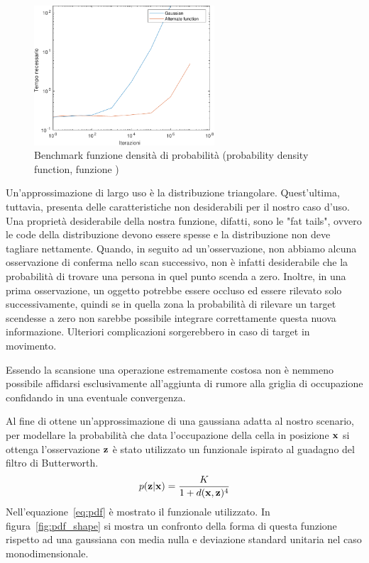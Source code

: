 \documentclass[a4paper]{article}
\begin{document}
	\begin{figure}[H]
		\centering
		\includegraphics[width=0.6\textwidth]{./img/pdf_benchmark.pdf}
		\caption{Benchmark funzione densità di probabilità (probability density function, funzione )}
		\label{fig:pdf_benchmark}
	\end{figure}

	Un'approssimazione di largo uso è la distribuzione triangolare.
	Quest'ultima, tuttavia, presenta delle caratteristiche non desiderabili per
	il nostro caso d'uso. Una proprietà desiderabile della nostra funzione,
	difatti, sono le "fat tails", ovvero le code della distribuzione devono
	essere spesse e la distribuzione non deve tagliare nettamente. Quando, in
	seguito ad un'osservazione, non abbiamo alcuna osservazione di conferma
	nello scan successivo, non è infatti desiderabile che la probabilità di
	trovare una persona in quel punto scenda a zero. Inoltre, in una prima
	osservazione, un oggetto potrebbe essere occluso ed essere rilevato solo
	successivamente, quindi se in quella zona la probabilità di rilevare un
	target scendesse a zero non sarebbe possibile integrare correttamente
	questa nuova informazione. Ulteriori complicazioni sorgerebbero in caso di
	target in movimento.
	
	Essendo la scansione una operazione estremamente costosa non è nemmeno
	possibile affidarsi esclusivamente all'aggiunta di rumore alla griglia di
	occupazione confidando in una eventuale convergenza.

	Al fine di ottene un'approssimazione di una gaussiana adatta al
	nostro scenario, per modellare la probabilità che data l'occupazione della
	cella in posizione $ {\bf x} $ si ottenga l'osservazione $ {\bf z} $ è
	stato utilizzato un funzionale ispirato al guadagno del filtro di
	Butterworth.
	\begin{equation}\label{eq:pdf}
		p({\bf z}|{\bf x}) = \frac	{K}
		{1 + d({\bf x},{\bf z})^4 } 
	\end{equation}
	Nell'equazione~\ref{eq:pdf} è mostrato il funzionale utilizzato. In
	figura~\ref{fig:pdf_shape} si mostra un confronto della forma di questa
	funzione rispetto ad una gaussiana con media nulla e deviazione standard
	unitaria nel caso monodimensionale.
	
\end{document}
